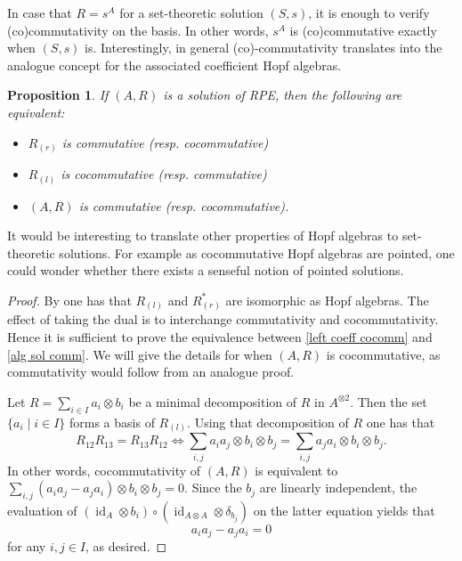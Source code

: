 \documentclass[a4paper,10pt]{amsart}
\newtheorem{proposition}[lemma]{Proposition}
\theoremstyle{definition}
\theoremstyle{remark}
\DeclareMathOperator{\id}{id}
\newcommand\ot{\otimes}
\begin{document}
In case that $R = s^{A}$ for a set-theoretic solution $(S,s)$, it is enough to verify (co)commutativity on the basis. In other words, $s^A$ is (co)commutative exactly when $(S,s)$ is. Interestingly, in general (co)-commutativity translates into the analogue concept for the associated coefficient Hopf algebras. 
\begin{proposition}\label{behaviour cocomm}
If $(A,R)$ is a solution of RPE, then the following are equivalent:
\begin{itemize}
    \item $R_{(r)}$ is commutative (resp. cocommutative) 
    \item\label{left coeff cocomm} $R_{(l)}$ is cocommutative (resp. commutative)
    \item\label{alg sol comm} $(A,R)$ is commutative (resp. cocommutative).
    \end{itemize}
\end{proposition}
 It would be interesting to translate other properties of Hopf algebras to set-theoretic solutions.  For example as cocommutative Hopf algebras are pointed, one could wonder whether there exists a senseful notion of pointed solutions.
\begin{proof}
By \cite[Theorem 2.1]{Mi04} one has that $R_{(l)}$ and $R_{(r)}^*$ are isomorphic as Hopf algebras. The effect of taking the dual is to interchange commutativity and cocommutativity. Hence it is sufficient to prove the equivalence between \eqref{left coeff cocomm} and \eqref{alg sol comm}. We will give the details for when $(A,R)$ is cocommutative, as commutativity would follow from an analogue proof.

Let $R = \sum_{i \in I} a_i \ot b_i$ be a minimal decomposition of $R$ in $A^{\ot 2}$. Then the set $\{ a_i \mid i \in I\}$ forms a basis of $R_{(l)}$. Using that decomposition of $R$ one has that 
$$R_{12}R_{13} = R_{13}R_{12} \Leftrightarrow \sum_{i,j} a_ia_j \ot b_i \ot b_j = \sum_{i,j} a_ja_i\ot b_i \ot b_j.$$
In other words, cocommutativity of $(A,R)$ is equivalent to $\sum_{i,j} (a_ia_j - a_ja_i) \ot b_i \ot b_j=0.$ Since the $b_j$ are linearly independent, the evaluation of $(\id_{A} \ot b_i)\circ(\id_{A \ot A} \ot \delta_{b_j})$ on the latter equation yields that
$$ a_i a_j - a_ja_i  = 0$$
for any $i, j \in I$, as desired.
\end{proof}
\end{document}
